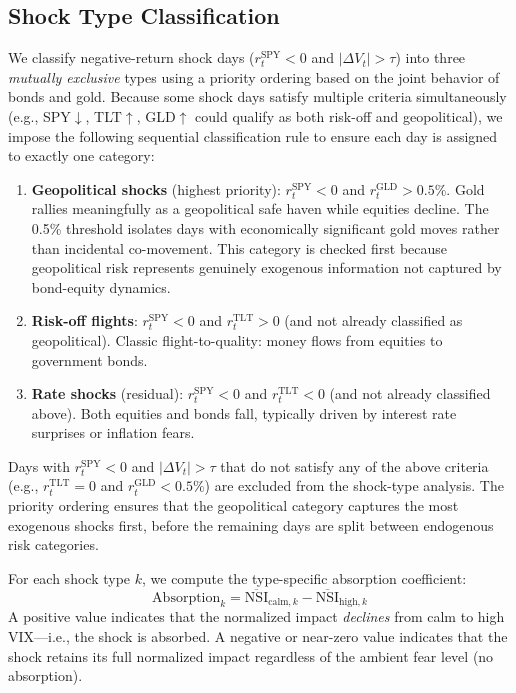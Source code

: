 \documentclass[12pt,a4paper]{article}
\begin{document}
\subsection{Shock Type Classification}

We classify negative-return shock days ($r_t^{\text{SPY}} < 0$ and $|\Delta V_t| > \tau$) into three \textit{mutually exclusive} types using a priority ordering based on the joint behavior of bonds and gold. Because some shock days satisfy multiple criteria simultaneously (e.g., SPY$\downarrow$, TLT$\uparrow$, GLD$\uparrow$ could qualify as both risk-off and geopolitical), we impose the following sequential classification rule to ensure each day is assigned to exactly one category:
\begin{enumerate}
    \item \textbf{Geopolitical shocks} (highest priority): $r_t^{\text{SPY}} < 0$ and $r_t^{\text{GLD}} > 0.5\%$. Gold rallies meaningfully as a geopolitical safe haven while equities decline. The 0.5\% threshold isolates days with economically significant gold moves rather than incidental co-movement. This category is checked first because geopolitical risk represents genuinely exogenous information not captured by bond-equity dynamics.
    \item \textbf{Risk-off flights}: $r_t^{\text{SPY}} < 0$ and $r_t^{\text{TLT}} > 0$ (and not already classified as geopolitical). Classic flight-to-quality: money flows from equities to government bonds.
    \item \textbf{Rate shocks} (residual): $r_t^{\text{SPY}} < 0$ and $r_t^{\text{TLT}} < 0$ (and not already classified above). Both equities and bonds fall, typically driven by interest rate surprises or inflation fears.
\end{enumerate}
Days with $r_t^{\text{SPY}} < 0$ and $|\Delta V_t| > \tau$ that do not satisfy any of the above criteria (e.g., $r_t^{\text{TLT}} = 0$ and $r_t^{\text{GLD}} < 0.5\%$) are excluded from the shock-type analysis. The priority ordering ensures that the geopolitical category captures the most exogenous shocks first, before the remaining days are split between endogenous risk categories.

For each shock type $k$, we compute the type-specific absorption coefficient:
\begin{equation}
\text{Absorption}_k = \overline{\text{NSI}}_{\text{calm}, k} - \overline{\text{NSI}}_{\text{high}, k}
\label{eq:type_absorption}
\end{equation}
A positive value indicates that the normalized impact \textit{declines} from calm to high VIX---i.e., the shock is absorbed. A negative or near-zero value indicates that the shock retains its full normalized impact regardless of the ambient fear level (no absorption).
\end{document}
